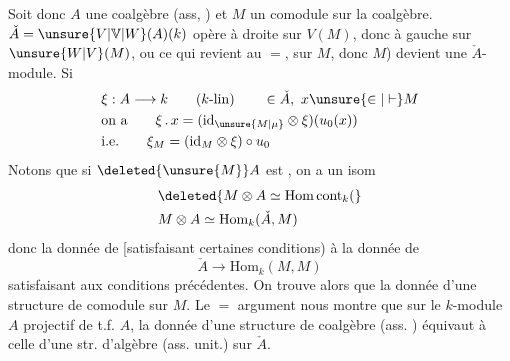 Soit donc $A$ une coalgèbre (ass, ) et $M$ un comodule  sur la coalgèbre. $\check A=\unsure{V|\mathbb V|W}(A)(k)$ opère à droite sur $V(M)$, donc à gauche sur $\unsure{W|V}(M)$, ou ce qui revient au $=$, sur $M$, donc $M$) devient une $\check A$-module. Si
\[
\begin{aligned}
 &\xi:A\longrightarrow k\qquad(k\text{-}\mathrm{lin})\qquad\in\check A,\ x\unsure{\in|\vdash}M\\
 &\text{on a}\qquad \xi\,.\,x=(\mathrm{id}_{\unsure{M|\mu}}\otimes\xi)(u_0(x))\\
 &\text{i.e.}\qquad \xi_M=(\mathrm{id}_M\otimes\xi)\circ u_0
\end{aligned}
\]
Notons que si $\deleted{\unsure{M}}A$ est , on a un isom
\[
\begin{aligned}
 &\deleted{M\otimes A\simeq\mathrm{Hom}\,\mathrm{cont}_k(}\\
 &M\otimes A\simeq\mathrm{Hom}_k(\check A,M)
\end{aligned}
\]
donc la donnée de
[satisfaisant certaines conditions)  à la donnée de
\[
 \check A\longrightarrow\mathrm{Hom}_k(M,M)
\]
satisfaisant aux conditions précédentes. On trouve alors que la donnée d'une structure de comodule  sur $M$. Le $=$ argument nous montre que sur le $k$-module $A$ projectif de t.f. $A$, la donnée d'une structure de coalgèbre (ass. ) équivaut à celle d'une str. d'algèbre (ass. unit.) sur $\check A$.

